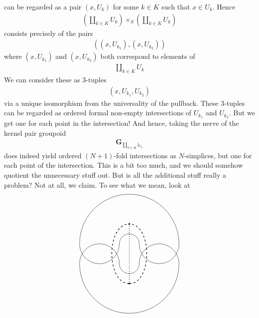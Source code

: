 can be regarded as a pair $(x,U_{k})$ for some $k \in K$ such that $x \in U_{k}$.
Hence
\begin{align*}
  \left(
    \coprod_{k \in K}
    U_{k}
  \right)
  \times_{S}
  \left(
    \coprod_{k \in K}
    U_{k}
  \right)
\end{align*}
consists precisely of the pairs
\begin{align*}
  \left(
    (x,U_{k_{1}}),
    (x,U_{k_{2}})
  \right)
\end{align*}
where $(x,U_{k_{1}})$ and $(x,U_{k_{2}})$ both correspond to elements of
\begin{align*}
  \coprod_{k \in K}
  U_{k}
\end{align*}
We can consider these as $3$-tuples
\begin{align*}
  \left(
    x,
    U_{k_{1}},
    U_{k_{2}}
  \right)
\end{align*}
via a unique isomorphism from the universality of the pullback.
These $3$-tuples can be regarded as ordered formal non-empty intersections of $U_{k_{1}}$ and $U_{k_{2}}$.
But we get one for each point in the intersection!
And hence, taking the nerve of the kernel pair groupoid
\begin{align*}
  \mathbf{G}_{\coprod_{k \in K}\mathrm{i}_{U_{k}}}
\end{align*}
does indeed yield ordered $(N + 1)$-fold intersections as $N$-simplices, but one for each point of the intersection.
This is a bit too much, and we should somehow quotient the unnecessary stuff out.
But is all the additional stuff really a problem? Not at all, we claim.
To see what we mean, look at
\[
\begin{tikzpicture}[scale=0.5]
  \coordinate (u1) at (0,-3);
  \coordinate (u2) at (0,3);
  \draw[dotted,thick]
    (u1)
    --
    (u2);
  \draw[dashed,thick]
    (u1)
    to[bend left=90]
    (u2);
  \draw[dashed,thick]
    (u1)
    to[bend right=90]
    (u2);
  \draw[domain=0:180]
    plot
    ({cos(\x)},{sin(\x)+1});
  \draw[domain=0:180]
    plot
    ({5*cos(\x)},{5*sin(\x)+1});
  \draw[domain=180:360]
    plot
    ({cos(\x)},{sin(\x)-1});
  \draw[domain=180:360]
    plot
    ({5*cos(\x)},{5*sin(\x)-1});
  \draw[domain=180:360]
    plot
    ({2*cos(\x)-3},{2*sin(\x)+1});
  \draw[domain=180:360]
    plot
    ({2*cos(\x)+3},{2*sin(\x)+1});
  \draw[domain=0:180]
    plot
    ({2*cos(\x)-3},{2*sin(\x)-1});
  \draw[domain=0:180]
    plot
    ({2*cos(\x)+3},{2*sin(\x)-1});
  \filldraw
    (u1)
    circle
    [radius=2pt];
  \filldraw
    (u2)
    circle
    [radius=2pt];
\end{tikzpicture}
\]
